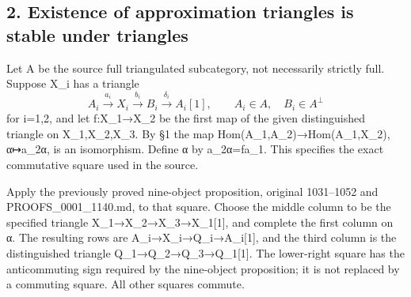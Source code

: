 \subsection{2. Existence of approximation triangles is stable under triangles}\label{proofs-11665-12003-existence-of-approximation-triangles-is-stable-under-triangles}

Let A be the source full triangulated subcategory,\allowbreak{} not necessarily strictly full. Suppose X\_\allowbreak{}i has a triangle \[
 A_i\xrightarrow{a_i}X_i\xrightarrow{b_i}B_i
 \xrightarrow{\delta_i}A_i[1],\qquad A_i\in A,\quad B_i\in A^\perp
\] for i\allowbreak{}=1,\allowbreak{}2,\allowbreak{} and let f:\allowbreak{}X\_\allowbreak{}1\allowbreak{}→X\_\allowbreak{}2 be the first map of the given distinguished triangle on X\_\allowbreak{}1,\allowbreak{}X\_\allowbreak{}2,\allowbreak{}X\_\allowbreak{}3. By §1 the map Hom(A\_\allowbreak{}1,\allowbreak{}A\_\allowbreak{}2)\allowbreak{}\allowbreak{}→Hom(A\_\allowbreak{}1,\allowbreak{}X\_\allowbreak{}2)\allowbreak{},\allowbreak{} α\allowbreak{}↦a\_\allowbreak{}2α,\allowbreak{} is an isomorphism. Define α by a\_\allowbreak{}2α\allowbreak{}=fa\_\allowbreak{}1. This specifies the exact commutative square used in the source.

Apply the previously proved nine-object proposition,\allowbreak{} original 1031–\allowbreak{}1052 and PROOFS\_\allowbreak{}0001\_\allowbreak{}1140.md,\allowbreak{} to that square. Choose the middle column to be the specified triangle X\_\allowbreak{}1\allowbreak{}→X\_\allowbreak{}2\allowbreak{}→X\_\allowbreak{}3\allowbreak{}→X\_\allowbreak{}1[1]\allowbreak{},\allowbreak{} and complete the first column on α. The resulting rows are A\_\allowbreak{}i\allowbreak{}→X\_\allowbreak{}i\allowbreak{}→Q\_\allowbreak{}i\allowbreak{}→A\_\allowbreak{}i[1]\allowbreak{},\allowbreak{} and the third column is the distinguished triangle Q\_\allowbreak{}1\allowbreak{}→Q\_\allowbreak{}2\allowbreak{}→Q\_\allowbreak{}3\allowbreak{}→Q\_\allowbreak{}1[1]\allowbreak{}. The lower-right square has the anticommuting sign required by the nine-object proposition; it is not replaced by a commuting square. All other squares commute.

